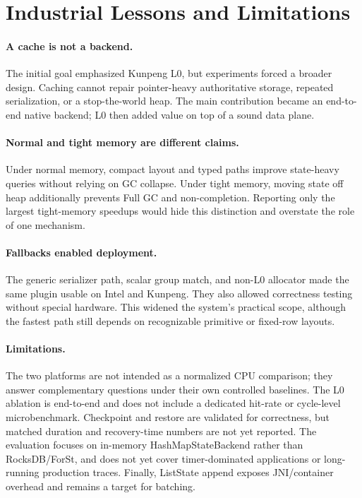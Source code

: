 \documentclass[sigconf]{acmart}
\begin{document}
\section{Industrial Lessons and Limitations}

\paragraph{A cache is not a backend.}
The initial goal emphasized Kunpeng L0, but experiments forced a broader design. Caching cannot repair pointer-heavy authoritative storage, repeated serialization, or a stop-the-world heap. The main contribution became an end-to-end native backend; L0 then added value on top of a sound data plane.

\paragraph{Normal and tight memory are different claims.}
Under normal memory, compact layout and typed paths improve state-heavy queries without relying on GC collapse. Under tight memory, moving state off heap additionally prevents Full GC and non-completion. Reporting only the largest tight-memory speedups would hide this distinction and overstate the role of one mechanism.

\paragraph{Fallbacks enabled deployment.}
The generic serializer path, scalar group match, and non-L0 allocator made the same plugin usable on Intel and Kunpeng. They also allowed correctness testing without special hardware. This widened the system's practical scope, although the fastest path still depends on recognizable primitive or fixed-row layouts.

\paragraph{Limitations.}
The two platforms are not intended as a normalized CPU comparison; they answer complementary questions under their own controlled baselines. The L0 ablation is end-to-end and does not include a dedicated hit-rate or cycle-level microbenchmark. Checkpoint and restore are validated for correctness, but matched duration and recovery-time numbers are not yet reported. The evaluation focuses on in-memory HashMapStateBackend rather than RocksDB/ForSt, and does not yet cover timer-dominated applications or long-running production traces. Finally, ListState append exposes JNI/container overhead and remains a target for batching.
\end{document}
